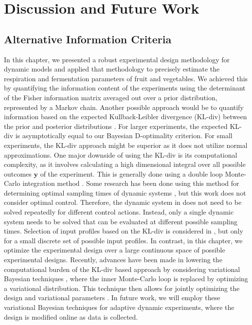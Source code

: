 \section{Discussion and Future Work}
\label{sec_discussion}
\subsection{Alternative Information Criteria}
In this chapter, we presented a robust experimental design methodology for dynamic models and applied that methodology to precisely estimate the respiration and fermentation parameters of fruit and vegetables. We achieved this by quantifying the information content of the experiments using the determinant of the Fisher information matrix averaged out over a prior distribution, represented by a Markov chain. Another possible approach would be to quantify information based on the expected Kullback-Leibler divergence (KL-div) between the prior and posterior distributions \parencite{lindley}. For larger experiments, the expected KL-div is asymptotically equal to our Bayesian D-optimality criterion. For small experiments, the KL-div approach might be superior as it does not utilize normal approximations. One major downside of using the KL-div is its computational complexity, as it involves calculating a high dimensional integral over all possible outcomes $\bm y $ of the experiment. This is generally done using a double loop Monte-Carlo integration method \parencite{ryan}. Some research has been done using this method for determining optimal sampling times of dynamic systems \parencite{overstall2}, but this work does not consider optimal control. Therefore, the dynamic system in  \parencite{overstall2} does not need to be  solved repeatedly for different control actions. Instead, only a single dynamic system needs to be solved that can be evaluated at different possible sampling times. Selection of input profiles based on the KL-div is considered in \textcite{liepe}, but only for a small  discrete set of possible input profiles. In contrast, in this chapter, we optimize the experimental design over a large continuous space of possible experimental designs. Recently, advances have been made in lowering the computational burden of the KL-div based approach by considering variational Bayesian techniques \parencite{foster}, where the inner Monte-Carlo loop is replaced by optimizing a variational distribution. This technique then allows for jointly optimizing the design and variational parameters \parencite{foster2}. In future work, we will employ these variational Bayesian techniques for adaptive dynamic experiments, where the design is modified online as data is collected.
